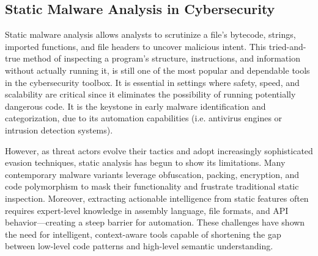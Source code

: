 \subsection{Static Malware Analysis in Cybersecurity}
Static malware analysis allows analysts to scrutinize a file's bytecode, strings, imported
functions, and file headers to uncover malicious intent. This tried-and-true method of inspecting a
program's structure, instructions, and information without actually running it, is still one of the
most popular and dependable tools in the cybersecurity toolbox. It is essential in settings where
safety, speed, and scalability are critical since it eliminates the possibility of running
potentially dangerous code. It is the keystone in early malware identification and categorization,
due to its automation capabilities (i.e. antivirus engines or intrusion detection systems).

However, as threat actors evolve their tactics and adopt increasingly sophisticated evasion
techniques, static analysis has begun to show its limitations. Many contemporary malware variants
leverage obfuscation, packing, encryption, and code polymorphism to mask their functionality and
frustrate traditional static inspection. Moreover, extracting actionable intelligence from static
features often requires expert-level knowledge in assembly language, file formats, and API
behavior—creating a steep barrier for automation. These challenges have shown the need for
intelligent, context-aware tools capable of shortening the gap between low-level code patterns and
high-level semantic understanding.

